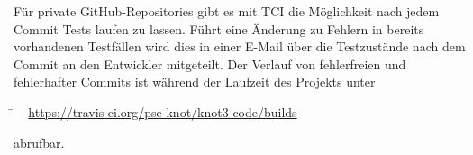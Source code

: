 \begin{description}
	Für private GitHub-Repositories gibt es mit TCI die Möglichkeit nach jedem Commit Tests laufen zu lassen.
	Führt eine Änderung zu Fehlern in bereits vorhandenen Testfällen wird dies in einer E-Mail über die Testzustände nach dem Commit an den Entwickler mitgeteilt. Der Verlauf von fehlerfreien und fehlerhafter Commits ist während der Laufzeit des Projekts unter
	
	\begin{tabbing}
			\= ~ \href {https://travis-ci.org/pse-knot/knot3-code/builds}
		    {https://travis-ci.org/pse-knot/knot3-code/builds}
		   
	\end{tabbing} abrufbar.
	\\
	

\end{description}


